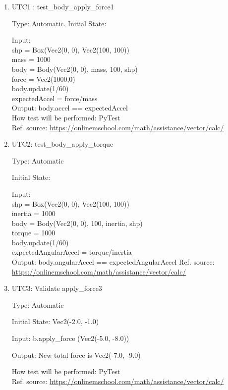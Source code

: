 \documentclass[12pt, titlepage]{article}
\begin{document}
\begin{enumerate}
	

\item{UTC1} {: test\_body\_apply\_force1 \\}

Type: Automatic.
Initial State: 

Input: \\
shp = Box(Vec2(0, 0), Vec2(100, 100))\\
mass = 1000\\
body = Body(Vec2(0, 0), mass, 100, shp)\\
force = Vec2(1000,0)\\
body.update(1/60)\\
expectedAccel = force/mass\\

Output: body.accel == expectedAccel\\	
How test will be performed: PyTest\\ 
Ref. source: \url{https://onlinemschool.com/math/assistance/vector/calc/}
					
\item{UTC2}{: test\_body\_apply\_torque\\}

Type: Automatic

Initial State: 

Input: \\
shp = Box(Vec2(0, 0), Vec2(100, 100))\\
inertia = 1000\\
body = Body(Vec2(0, 0), 100, inertia, shp)\\
torque = 1000\\
body.update(1/60)\\
expectedAngularAccel = torque/inertia\\

Output: body.angularAccel == expectedAngularAccel
Ref. source: \url{https://onlinemschool.com/math/assistance/vector/calc/}

\item{UTC3}{: Validate apply\_force3\\}

Type: Automatic

Initial State: Vec2(-2.0, -1.0)

Input: b.apply\_force (Vec2(-5.0, -8.0))

Output: New total force is Vec2(-7.0, -9.0)
					
How test will be performed: PyTest\\
Ref. source: \url{https://onlinemschool.com/math/assistance/vector/calc/}


\end{enumerate}
\end{document}
